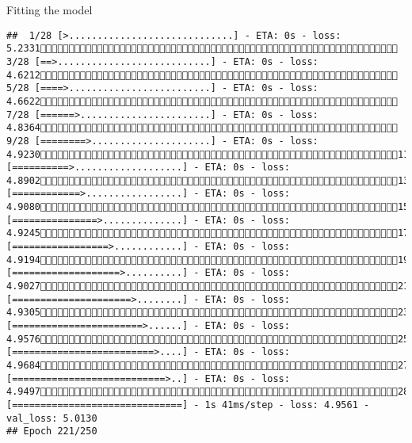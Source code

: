 \documentclass[
  ignorenonframetext,
]{beamer}
\begin{document}
\begin{frame}[fragile]{Fitting the model}
\begin{verbatim}
##  1/28 [>.............................] - ETA: 0s - loss: 5.2331 3/28 [==>...........................] - ETA: 0s - loss: 4.6212 5/28 [====>.........................] - ETA: 0s - loss: 4.6622 7/28 [======>.......................] - ETA: 0s - loss: 4.8364 9/28 [========>.....................] - ETA: 0s - loss: 4.923011/28 [==========>...................] - ETA: 0s - loss: 4.890213/28 [============>.................] - ETA: 0s - loss: 4.908015/28 [===============>..............] - ETA: 0s - loss: 4.924517/28 [=================>............] - ETA: 0s - loss: 4.919419/28 [===================>..........] - ETA: 0s - loss: 4.902721/28 [=====================>........] - ETA: 0s - loss: 4.930523/28 [=======================>......] - ETA: 0s - loss: 4.957625/28 [=========================>....] - ETA: 0s - loss: 4.968427/28 [===========================>..] - ETA: 0s - loss: 4.949728/28 [==============================] - 1s 41ms/step - loss: 4.9561 - val_loss: 5.0130
## Epoch 221/250

\end{verbatim}
\end{frame}
\end{document}
